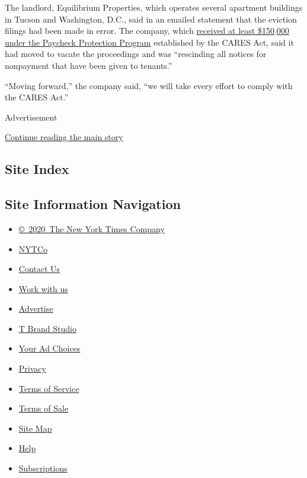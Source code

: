 The landlord, Equilibrium Properties, which operates several apartment
buildings in Tucson and Washington, D.C., said in an emailed statement
that the eviction filings had been made in error. The company, which
\href{https://projects.propublica.org/coronavirus/bailouts/loans/equilibrium-realty-llc-af99191e3bb8f54ef7b7046b9a4fe5be}{received
at least \$150,000 under the Paycheck Protection Program} established by
the CARES Act, said it had moved to vacate the proceedings and was
``rescinding all notices for nonpayment that have been given to
tenants.''

``Moving forward,'' the company said, ``we will take every effort to
comply with the CARES Act.''

Advertisement

\protect\hyperlink{after-bottom}{Continue reading the main story}

\hypertarget{site-index}{%
\subsection{Site Index}\label{site-index}}

\hypertarget{site-information-navigation}{%
\subsection{Site Information
Navigation}\label{site-information-navigation}}

\begin{itemize}
\tightlist
\item
  \href{https://help.nytimes3xbfgragh.onion/hc/en-us/articles/115014792127-Copyright-notice}{©~2020~The
  New York Times Company}
\end{itemize}

\begin{itemize}
\tightlist
\item
  \href{https://www.nytco.com/}{NYTCo}
\item
  \href{https://help.nytimes3xbfgragh.onion/hc/en-us/articles/115015385887-Contact-Us}{Contact
  Us}
\item
  \href{https://www.nytco.com/careers/}{Work with us}
\item
  \href{https://nytmediakit.com/}{Advertise}
\item
  \href{http://www.tbrandstudio.com/}{T Brand Studio}
\item
  \href{https://www.nytimes3xbfgragh.onion/privacy/cookie-policy\#how-do-i-manage-trackers}{Your
  Ad Choices}
\item
  \href{https://www.nytimes3xbfgragh.onion/privacy}{Privacy}
\item
  \href{https://help.nytimes3xbfgragh.onion/hc/en-us/articles/115014893428-Terms-of-service}{Terms
  of Service}
\item
  \href{https://help.nytimes3xbfgragh.onion/hc/en-us/articles/115014893968-Terms-of-sale}{Terms
  of Sale}
\item
  \href{https://spiderbites.nytimes3xbfgragh.onion}{Site Map}
\item
  \href{https://help.nytimes3xbfgragh.onion/hc/en-us}{Help}
\item
  \href{https://www.nytimes3xbfgragh.onion/subscription?campaignId=37WXW}{Subscriptions}
\end{itemize}
